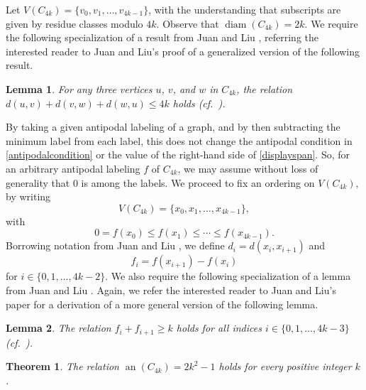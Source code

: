 \documentclass[12pt]{article}
\newtheorem{theorem}{Theorem}
\newtheorem{lemma}{Lemma}%
\begin{document}
 Let $V(C_{4k}) = \{ v_{0}, v_{1}, \ldots, v_{4k-1} \}$, 
 with the understanding that subscripts are given by residue classes modulo $4k$. 
          Observe that $\operatorname{diam}(C_{4k}) = 2k$. We require 
 the following specialization of 
 a result from Juan and Liu \cite[Proposition 1]{JuanLiu2012}, 
 referring the interested reader to Juan and Liu's proof of a generalized version of the following result. 

\begin{lemma}\label{lemmadistance}
 For any three vertices $u$, $v$, and $w$ in $C_{4k}$, the relation 
 $ d(u, v) + d(v, w) + d(w, u) \leq 4 k $
 holds (cf.\ \cite[Proposition 1]{JuanLiu2012}). 
\end{lemma}

 By taking a given antipodal labeling of a graph, and by then subtracting the minimum label from each label, this does not change the 
 antipodal condition in \eqref{antipodalcondition} or the value of the right-hand side of \eqref{displayspan}. So, for an arbitrary antipodal 
 labeling $f$ of $C_{4k}$, we may assume without loss of generality that $0$ is among the labels. We proceed to fix an ordering on 
 $V(C_{4k})$, by writing 
\begin{equation}\label{VC4k} 
 V(C_{4k}) = \{ x_0, x_1, \ldots, x_{4k-1} \}, 
\end{equation}
 with 
\begin{equation}\label{orderfx} 
 0 = f(x_0) \leq f(x_1) \leq \cdots \leq f(x_{4k-1}). 
\end{equation}
 Borrowing notation from Juan and Liu \cite{JuanLiu2012}, we define $d_{i} = d(x_{i}, x_{i+1})$ and 
\begin{equation}\label{definefi} 
 f_{i} = f(x_{i+1}) - f(x_{i})
\end{equation}
 for $i \in \{ 0, 1, \ldots, 4k-2 \}$. We also require the following specialization of a lemma from Juan and Liu \cite[Lemma 2]{JuanLiu2012}. 
 Again, we refer the interested reader to Juan and Liu's paper for a derivation of a more general version of 
 the following lemma. 
 
\begin{lemma}\label{boundfsum}
 The relation $f_{i} + f_{i+1} \geq k$ holds for all indices 
 $i \in \{ 0, 1, \ldots, 4k - 3 \}$ (cf.\ \cite[Lemma 2]{JuanLiu2012}). 
\end{lemma} 

\begin{theorem}\label{maintheorem}
 The relation $\operatorname{an}(C_{4k}) = 2k^2 - 1$ holds for every positive integer $k$. 
\end{theorem}
\end{document}

